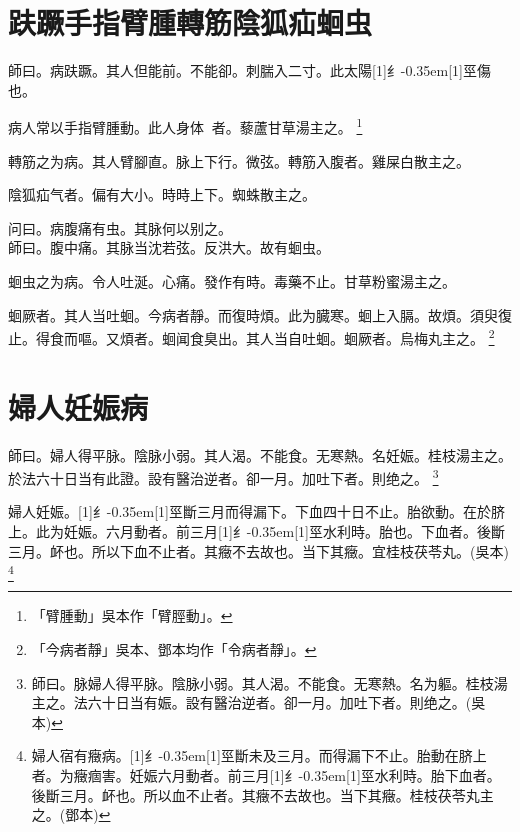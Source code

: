 \documentclass[oneside,b4paper]{ctexbook}
\begin{document}
\begin{flushleft}
\chapter{趺蹶手指臂腫轉筋陰狐疝蛔虫}

師曰。病趺蹶。其人但能前。不能卻。刺腨入二寸。此太陽{\hbox{\scalebox{0.68}[1]{纟}\kern-0.35em\scalebox{0.64}[1]{巠}}}傷也。

病人常以手指臂腫動。此人身体{𥆧}{𥆧}者。藜蘆甘草湯主之。
\footnote{「臂腫動」吳本作「臂脛動」。}

轉筋之为病。其人臂腳直。脉上下行。微弦。轉筋入腹者。雞屎白散主之。

陰狐疝气者。偏有大小。時時上下。蜘蛛散主之。

问曰。病腹痛有虫。其脉何以别之。\\
師曰。腹中痛。其脉当沈若弦。反洪大。故有蛔虫。

蛔虫之为病。令人吐涎。心痛。發作有時。毒藥不止。甘草粉蜜湯主之。

蛔厥者。其人当吐蛔。今病者靜。而復時煩。此为臓寒。蛔上入膈。故煩。須臾復止。得食而嘔。又煩者。蛔闻食臭出。其人当自吐蛔。蛔厥者。烏梅丸主之。
\footnote{「今病者靜」吳本、鄧本均作「令病者靜」。}

\chapter{婦人妊娠病}

師曰。婦人得平脉。陰脉小弱。其人渴。不能食。无寒熱。名妊娠。桂枝湯主之。於法六十日当有此證。設有醫治逆者。卻一月。加吐下者。則绝之。
\footnote{師曰。脉婦人得平脉。陰脉小弱。其人渴。不能食。无寒熱。名为軀。桂枝湯主之。法六十日当有娠。設有醫治逆者。卻一月。加吐下者。則绝之。(吳本)}

婦人妊娠。{\hbox{\scalebox{0.68}[1]{纟}\kern-0.35em\scalebox{0.64}[1]{巠}}}斷三月而得漏下。下血四十日不止。胎欲動。在於脐上。此为妊娠。六月動者。前三月{\hbox{\scalebox{0.68}[1]{纟}\kern-0.35em\scalebox{0.64}[1]{巠}}}水利時。胎也。下血者。後斷三月。衃也。所以下血不止者。其癥不去故也。当下其癥。宜桂枝茯苓丸。(吳本)
\footnote{婦人宿有癥病。{\hbox{\scalebox{0.68}[1]{纟}\kern-0.35em\scalebox{0.64}[1]{巠}}}斷未及三月。而得漏下不止。胎動在脐上者。为癥痼害。妊娠六月動者。前三月{\hbox{\scalebox{0.68}[1]{纟}\kern-0.35em\scalebox{0.64}[1]{巠}}}水利時。胎下血者。後斷三月。衃也。所以血不止者。其癥不去故也。当下其癥。桂枝茯苓丸主之。(鄧本)}


\end{flushleft}
\end{document}
